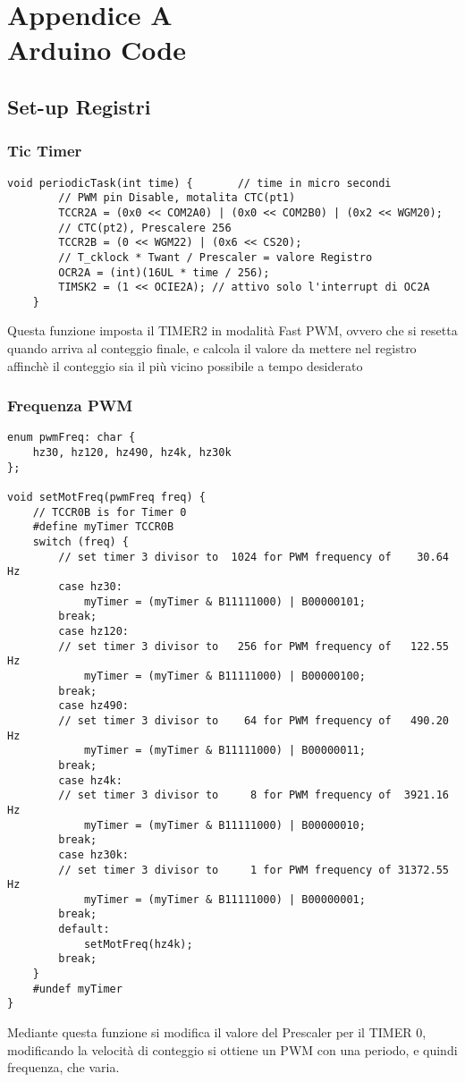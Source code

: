 \chapter*{Appendice A\\ Arduino Code}\label{ArduinoCode}
\setcounter{chapter}{\thechapter + 1}

\section{Set-up Registri}
\subsection{Tic Timer}

\begin{lstlisting}[style=cppStyle,caption={Tic Timer},label=lst:ticTimer] 
	void periodicTask(int time) { 		// time in micro secondi
		// PWM pin Disable, motalita CTC(pt1)
		TCCR2A = (0x0 << COM2A0) | (0x0 << COM2B0) | (0x2 << WGM20);
		// CTC(pt2), Prescalere 256
		TCCR2B = (0 << WGM22) | (0x6 << CS20);                       
		// T_cklock * Twant / Prescaler = valore Registro
		OCR2A = (int)(16UL * time / 256);
		TIMSK2 = (1 << OCIE2A); // attivo solo l'interrupt di OC2A
	}
\end{lstlisting}
Questa funzione imposta il TIMER2 in modalità Fast PWM, ovvero che si resetta quando arriva al conteggio finale, e calcola il valore da mettere nel registro affinchè il conteggio sia il più vicino possibile a tempo desiderato

\subsection{Frequenza PWM}

\begin{lstlisting}[style=cppStyle,caption={Frequenza PWM},label=lst:pwmFreq] 
enum pwmFreq: char {
	hz30, hz120, hz490, hz4k, hz30k
};

void setMotFreq(pwmFreq freq) {
	// TCCR0B is for Timer 0
	#define myTimer TCCR0B
	switch (freq) {
		// set timer 3 divisor to  1024 for PWM frequency of    30.64 Hz
		case hz30:
			myTimer = (myTimer & B11111000) | B00000101;
		break;
		case hz120:
		// set timer 3 divisor to   256 for PWM frequency of   122.55 Hz
			myTimer = (myTimer & B11111000) | B00000100;
		break;
		case hz490:
		// set timer 3 divisor to    64 for PWM frequency of   490.20 Hz
			myTimer = (myTimer & B11111000) | B00000011;
		break;
		case hz4k:
		// set timer 3 divisor to     8 for PWM frequency of  3921.16 Hz
			myTimer = (myTimer & B11111000) | B00000010;
		break;
		case hz30k:
		// set timer 3 divisor to     1 for PWM frequency of 31372.55 Hz
			myTimer = (myTimer & B11111000) | B00000001;
		break;
		default:
			setMotFreq(hz4k);
		break;
	}
	#undef myTimer
}
\end{lstlisting}
Mediante questa funzione si modifica il valore del Prescaler per il TIMER 0, modificando la velocità di conteggio si ottiene un PWM con una periodo, e quindi frequenza, che varia.

